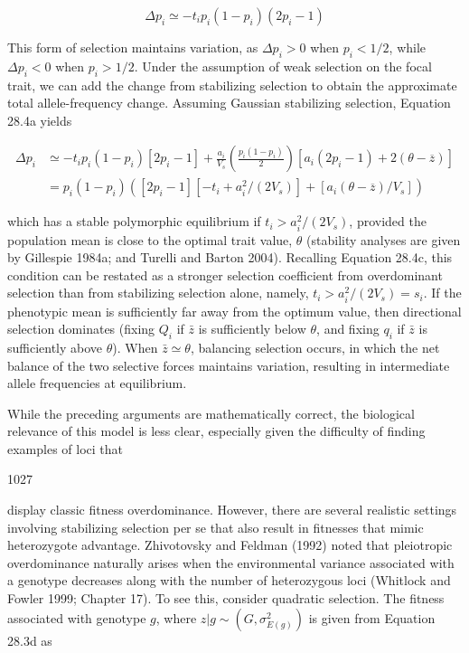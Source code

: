 \documentclass{article}
\begin{document}
\begin{equation}
\Delta p_{i}\simeq-t_{i}p_{i}(1-p_{i})(2p_{i}-1)
\tag{28.7}
\label{eq:28_7}
\end{equation}

This form of selection maintains variation, as  $ \Delta p_i > 0 $ when  $ p_i < 1/2 $, while  $ \Delta p_i < 0 $ when  $ p_i > 1/2 $. Under the assumption of weak selection on the focal trait, we can add the change from stabilizing selection to obtain the approximate total allele-frequency change. Assuming Gaussian stabilizing selection, Equation 28.4a yields

\begin{equation}
\begin{align*}\Delta p_{i}&\simeq-t_{i}p_{i}(1-p_{i})[2p_{i}-1]+\frac{a_{i}}{V_{s}}\left(\frac{p_{i}(1-p_{i})}{2}\right)\left[a_{i}\left(2p_{i}-1\right)+2(\theta-\overline{z})\right]\\&=p_{i}(1-p_{i})\left([2p_{i}-1]\left[-t_{i}+a_{i}^{2}/(2V_{s})\right]+[a_{i}(\theta-\overline{z})/V_{s}]\right)\end{align*}
\tag{28.8}
\label{eq:28_8}
\end{equation}

which has a stable polymorphic equilibrium if  $ t_i > a_i^2/(2V_s) $, provided the population mean is close to the optimal trait value,  $ \theta $ (stability analyses are given by Gillespie 1984a; and Turelli and Barton 2004). Recalling Equation 28.4c, this condition can be restated as a stronger selection coefficient from overdominant selection than from stabilizing selection alone, namely,  $ t_i > a_i^2/(2V_s) = s_i $. If the phenotypic mean is sufficiently far away from the optimum value, then directional selection dominates (fixing  $ Q_i $ if  $ \bar{z} $ is sufficiently below  $ \theta $, and fixing  $ q_i $ if  $ \bar{z} $ is sufficiently above  $ \theta $). When  $ \bar{z} \simeq \theta $, balancing selection occurs, in which the net balance of the two selective forces maintains variation, resulting in intermediate allele frequencies at equilibrium.

While the preceding arguments are mathematically correct, the biological relevance of this model is less clear, especially given the difficulty of finding examples of loci that

1027

display classic fitness overdominance. However, there are several realistic settings involving stabilizing selection per se that also result in fitnesses that mimic heterozygote advantage. Zhivotovsky and Feldman (1992) noted that pleiotropic overdominance naturally arises when the environmental variance associated with a genotype decreases along with the number of heterozygous loci (Whitlock and Fowler 1999; Chapter 17). To see this, consider quadratic selection. The fitness associated with genotype $g$, where $z|g \sim (G, \sigma_{E(g)}^{2})$ is given from Equation 28.3d as
\end{document}
